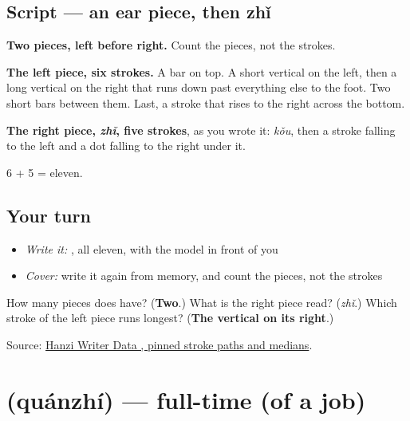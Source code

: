\subsection*{Script — an ear piece, then zhǐ}

\begin{quote}
\end{quote}

\textbf{Two pieces, left before right.} Count the pieces, not the strokes.

\textbf{The left piece, six strokes.} A bar on top. A short vertical on the left, then a long vertical on the right that runs down past everything else to the foot. Two short bars between them. Last, a stroke that rises to the right across the bottom.

\textbf{The right piece,  \emph{zhǐ}, five strokes}, as you wrote it:  \emph{kǒu}, then a stroke falling to the left and a dot falling to the right under it.

6 + 5 = eleven.

\subsection*{Your turn}
\begin{itemize}
\raggedright
  \item \emph{Write it:} , all eleven, with the model in front of you
  \item \emph{Cover:} write it again from memory, and count the pieces, not the strokes
\end{itemize}

\begin{tcolorbox}[breakable,colback=teal!4,colframe=teal!35!black,title={Before you move on}]
How many pieces does  have? (\textbf{Two}.) What is the right piece read? (\emph{zhǐ}.) Which stroke of the left piece runs longest? (\textbf{The vertical on its right}.)

Source: \href{https://raw.githubusercontent.com/chanind/hanzi-writer-data/68d10a4b21150cae5e1ebbd223eed289cf32d90c/data/\%E8\%81\%8C.json}{Hanzi Writer Data , pinned stroke paths and medians}.
\end{tcolorbox}
\section[\texorpdfstring{\zh{全职} (quánzhí)}{全职 (quánzhí)}]{ (quánzhí) — full-time (of a job)}

